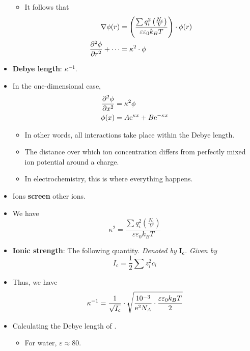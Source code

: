 \documentclass[../notes.tex]{subfiles}
\begin{document}
\begin{itemize}
\begin{itemize}
        \item It follows that
        \begin{align*}
            \nabla\phi(r) &= \left( \frac{\sum q_i^2\left( \frac{N_i}{V} \right)}{\varepsilon\varepsilon_0k_BT} \right)\cdot\phi(r)\\
            \pdv[2]{\phi}{r}+\cdots &= \kappa^2\cdot\phi
        \end{align*}
    \end{itemize}
    \item \textbf{Debye length}: $\kappa^{-1}$.
    \item In the one-dimensional case,
    \begin{align*}
        \pdv[2]{\phi}{x} &= \kappa^2\phi\\
        \phi(x) &= A\e[\kappa x]+B\e[-\kappa x]
    \end{align*}
    \begin{itemize}
        \item In other words, all interactions take place within the Debye length.
        \item The distance over which ion concentration differs from perfectly mixed ion potential around a charge.
        \item In electrochemistry, this is where everything happens.
    \end{itemize}
    \item Ions \textbf{screen} other ions.
    \item We have
    \begin{equation*}
        \kappa^2 = \frac{\sum q_i^2\left( \frac{N_i}{V} \right)}{\varepsilon\varepsilon_0k_BT}
    \end{equation*}
    \item \textbf{Ionic strength}: The following quantity. \emph{Denoted by} $\bm{I_c}$. \emph{Given by}
    \begin{equation*}
        I_c = \frac{1}{2}\sum z_i^2c_i
    \end{equation*}
    \item Thus, we have
    \begin{equation*}
        \kappa^{-1} = \frac{1}{\sqrt{I_c}}\cdot\sqrt{\frac{10^{-3}}{\e[2]N_A}\cdot\frac{\varepsilon\varepsilon_0k_BT}{2}}
    \end{equation*}
    \item Calculating the Debye length of .
    \begin{itemize}
        \item For water, $\varepsilon\approx 80$.

\end{itemize}
\end{itemize}
\end{document}

